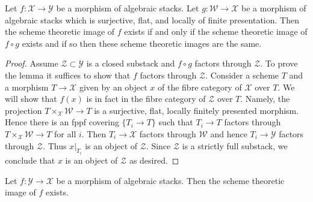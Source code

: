 \begin{lemma}
\label{lemma-cover-upstairs}
Let $f : \mathcal{X} \to \mathcal{Y}$ be a morphism of algebraic stacks.
Let $g : \mathcal{W} \to \mathcal{X}$ be a morphism of algebraic stacks
which is surjective, flat, and locally of finite presentation.
Then the scheme theoretic image of $f$ exists if and only if the
scheme theoretic image of $f \circ g$ exists and if so then these
scheme theoretic images are the same.
\end{lemma}

\begin{proof}
Assume $\mathcal{Z} \subset \mathcal{Y}$
is a closed substack and $f \circ g$ factors through $\mathcal{Z}$.
To prove the lemma it suffices to show
that $f$ factors through $\mathcal{Z}$.
Consider a scheme $T$ and a morphism $T \to \mathcal{X}$
given by an object $x$ of the fibre category of $\mathcal{X}$ over $T$.
We will show that $f(x)$ is in fact in the fibre category of $\mathcal{Z}$
over $T$. Namely, the projection $T \times_\mathcal{X} \mathcal{W} \to T$
is a surjective, flat, locally finitely presented morphism.
Hence there is an fppf covering $\{T_i \to T\}$ such that
$T_i \to T$ factors through $T \times_\mathcal{X} \mathcal{W} \to T$
for all $i$. Then $T_i \to \mathcal{X}$ factors through $\mathcal{W}$
and hence $T_i \to \mathcal{Y}$ factors through $\mathcal{Z}$.
Thus $x|_{T_i}$ is an object of $\mathcal{Z}$.
Since $\mathcal{Z}$ is a strictly full substack, we conclude
that $x$ is an object of $\mathcal{Z}$ as desired.
\end{proof}

\begin{lemma}
\label{lemma-scheme-theoretic-image-existence}
Let $f : \mathcal{Y} \to \mathcal{X}$ be a morphism of algebraic stacks.
Then the scheme theoretic image of $f$ exists.
\end{lemma}

